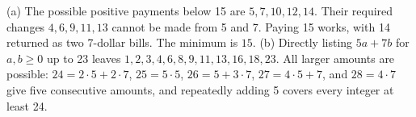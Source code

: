 (a) The possible positive payments below 15 are $5,7,10,12,14$. Their required changes $4,6,9,11,13$ cannot be made from 5 and 7. Paying 15 works, with 14 returned as two 7-dollar bills. The minimum is $\boxed{15}$. (b) Directly listing $5a+7b$ for $a,b\ge0$ up to 23 leaves $\boxed{1,2,3,4,6,8,9,11,13,16,18,23}$. All larger amounts are possible: $24=2\cdot5+2\cdot7$, $25=5\cdot5$, $26=5+3\cdot7$, $27=4\cdot5+7$, and $28=4\cdot7$ give five consecutive amounts, and repeatedly adding 5 covers every integer at least 24.
